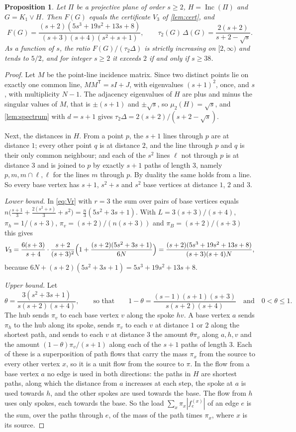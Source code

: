 \documentclass[11pt]{amsart}
\newtheorem{proposition}[theorem]{Proposition}
\theoremstyle{definition}
\DeclareMathOperator{\Inc}{Inc}
\begin{document}
\begin{proposition}\label{prop:pg}
Let $\Pi$ be a projective plane of order $s\ge2$, $H=\Inc(\Pi)$ and $G=K_1\vee H$. Then $F(G)$ equals the certificate $V_3$ of \cref{lem:cert}, and
\[
F(G)=\frac{(s+2)(5s^3+19s^2+13s+8)}{(s+3)(s+4)(s^2+s+1)},\qquad \tau_2(G)\,\Delta(G)=\frac{2(s+2)}{s+2-\sqrt s}.
\]
As a function of $s$, the ratio $F(G)/(\tau_2\Delta)$ is strictly increasing on $[2,\infty)$ and tends to $5/2$, and for integer $s\ge2$ it exceeds $2$ if and only if $s\ge38$.
\end{proposition}

\begin{proof}
Let $M$ be the point-line incidence matrix. Since two distinct points lie on exactly one common line, $MM^{\mathsf T}=sI+J$, with eigenvalues $(s+1)^2$, once, and $s$, with multiplicity $N-1$. The adjacency eigenvalues of $H$ are plus and minus the singular values of $M$, that is $\pm(s+1)$ and $\pm\sqrt s$, so $\mu_2(H)=\sqrt s$, and \cref{lem:spectrum} with $d=s+1$ gives $\tau_2\Delta=2(s+2)/(s+2-\sqrt s)$.

Next, the distances in $H$. From a point $p$, the $s+1$ lines through $p$ are at distance $1$; every other point $q$ is at distance $2$, and the line through $p$ and $q$ is their only common neighbour; and each of the $s^2$ lines $\ell$ not through $p$ is at distance $3$ and is joined to $p$ by exactly $s+1$ paths of length $3$, namely $p,m,m\cap\ell,\ell$ for the lines $m$ through $p$. By duality the same holds from a line. So every base vertex has $s+1$, $s^2+s$ and $s^2$ base vertices at distance $1$, $2$ and $3$.

\emph{Lower bound.} In \eqref{eq:Vr} with $r=3$ the sum over pairs of base vertices equals $n\bigl(\frac{s+1}3+\frac{2(s^2+s)}3+s^2\bigr)=\frac n3(5s^2+3s+1)$. With $L=3(s+3)/(s+4)$, $\pi_h=1/(s+3)$, $\pi_v=(s+2)/(n(s+3))$ and $\pi_B=(s+2)/(s+3)$ this gives
\[
V_3=\frac{6(s+3)}{s+4}\cdot\frac{s+2}{(s+3)^2}\Bigl(1+\frac{(s+2)(5s^2+3s+1)}{6N}\Bigr)=\frac{(s+2)(5s^3+19s^2+13s+8)}{(s+3)(s+4)N},
\]
because $6N+(s+2)(5s^2+3s+1)=5s^3+19s^2+13s+8$.

\emph{Upper bound.} Let
\[
\theta=\frac{3(s^2+3s+1)}{s(s+2)(s+4)},\qquad\text{so that}\qquad 1-\theta=\frac{(s-1)(s+1)(s+3)}{s(s+2)(s+4)}\quad\text{and}\quad0<\theta\le1 .
\]
The hub sends $\pi_v$ to each base vertex $v$ along the spoke $hv$. A base vertex $a$ sends $\pi_h$ to the hub along its spoke, sends $\pi_v$ to each $v$ at distance $1$ or $2$ along the shortest path, and sends to each $v$ at distance $3$ the amount $\theta\pi_v$ along $a,h,v$ and the amount $(1-\theta)\pi_v/(s+1)$ along each of the $s+1$ paths of length $3$. Each of these is a superposition of path flows that carry the mass $\pi_x$ from the source to every other vertex $x$, so it is a unit flow from the source to $\pi$. In the flow from a base vertex $a$ no edge is used in both directions: the paths in $H$ are shortest paths, along which the distance from $a$ increases at each step, the spoke at $a$ is used towards $h$, and the other spokes are used towards the base. The flow from $h$ uses only spokes, each towards the base. So the load $\sum_x\pi_x|f^{(x)}_e|$ of an edge $e$ is the sum, over the paths through $e$, of the mass of the path times $\pi_x$, where $x$ is its source.


\end{proof}
\end{document}
